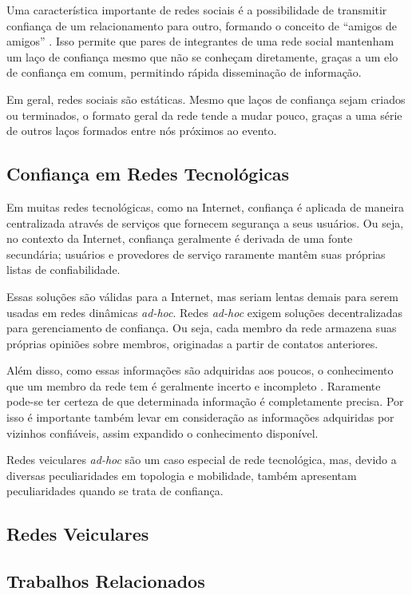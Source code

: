 \begin{resumoextendido}
	Uma característica importante de redes sociais é a possibilidade de transmitir confiança de um relacionamento para outro, formando o conceito de ``amigos de amigos'' \citep{boissevain1974friends}.
	Isso permite que pares de integrantes de uma rede social mantenham um laço de confiança mesmo que não se conheçam diretamente, graças a um elo de confiança em comum, permitindo rápida disseminação de informação.
	
	Em geral, redes sociais são estáticas.
	Mesmo que laços de confiança sejam criados ou terminados, o formato geral da rede tende a mudar pouco, graças a uma série de outros laços formados entre nós próximos ao evento.
	
	\subsection*{Confiança em Redes Tecnológicas}
	Em muitas redes tecnológicas, como na Internet, confiança é aplicada de maneira centralizada através de serviços que fornecem segurança a seus usuários.
	Ou seja, no contexto da Internet, confiança geralmente é derivada de uma fonte secundária; usuários e provedores de serviço raramente mantêm suas próprias listas de confiabilidade.
	
	Essas soluções são válidas para a Internet, mas seriam lentas demais para serem usadas em redes dinâmicas \textit{ad-hoc}.
	Redes \textit{ad-hoc} exigem soluções decentralizadas para gerenciamento de confiança.
	Ou seja, cada membro da rede armazena suas próprias opiniões sobre membros, originadas a partir de contatos anteriores.
	
	Além disso, como essas informações são adquiridas aos poucos, o conhecimento que um membro da rede tem é geralmente incerto e incompleto \citep{baras2005cooperation}.
	Raramente pode-se ter certeza de que determinada informação é completamente precisa.
	Por isso é importante também levar em consideração as informações adquiridas por vizinhos confiáveis, assim expandido o conhecimento disponível.
	
	Redes veiculares \textit{ad-hoc} são um caso especial de rede tecnológica, mas, devido a diversas peculiaridades em topologia e mobilidade, também apresentam peculiaridades quando se trata de confiança.
	
	\subsection*{Redes Veiculares}
	\subsection*{Trabalhos Relacionados}
	

\end{resumoextendido}
